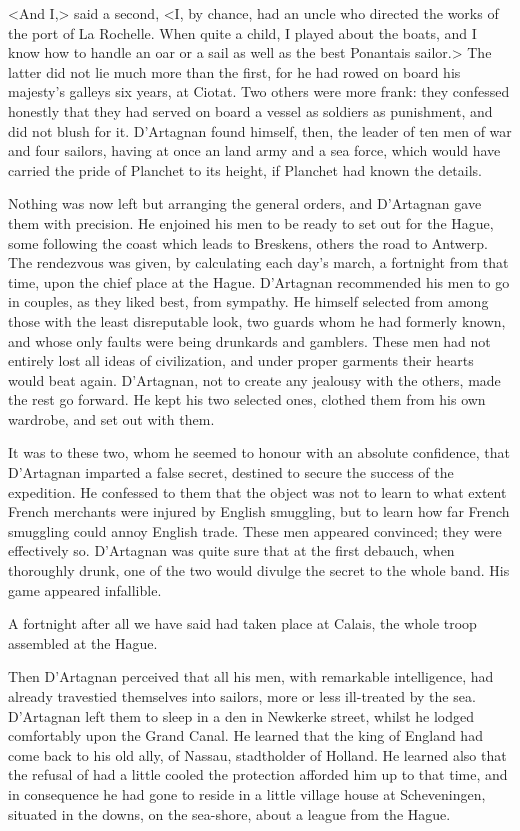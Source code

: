 <And I,> said a second, <I, by chance, had an uncle who directed the works of the port of La Rochelle. When quite a child, I played about the boats, and I know how to handle an oar or a sail as well as the best Ponantais sailor.> The latter did not lie much more than the first, for he had rowed on board his majesty's galleys six years, at Ciotat. Two others were more frank: they confessed honestly that they had served on board a vessel as soldiers as punishment, and did not blush for it. D'Artagnan found himself, then, the leader of ten men of war and four sailors, having at once an land army and a sea force, which would have carried the pride of Planchet to its height, if Planchet had known the details.

Nothing was now left but arranging the general orders, and D'Artagnan gave them with precision. He enjoined his men to be ready to set out for the Hague, some following the coast which leads to Breskens, others the road to Antwerp. The rendezvous was given, by calculating each day's march, a fortnight from that time, upon the chief place at the Hague. D'Artagnan recommended his men to go in couples, as they liked best, from sympathy. He himself selected from among those with the least disreputable look, two guards whom he had formerly known, and whose only faults were being drunkards and gamblers. These men had not entirely lost all ideas of civilization, and under proper garments their hearts would beat again. D'Artagnan, not to create any jealousy with the others, made the rest go forward. He kept his two selected ones, clothed them from his own wardrobe, and set out with them.

It was to these two, whom he seemed to honour with an absolute confidence, that D'Artagnan imparted a false secret, destined to secure the success of the expedition. He confessed to them that the object was not to learn to what extent French merchants were injured by English smuggling, but to learn how far French smuggling could annoy English trade. These men appeared convinced; they were effectively so. D'Artagnan was quite sure that at the first debauch, when thoroughly drunk, one of the two would divulge the secret to the whole band. His game appeared infallible.

A fortnight after all we have said had taken place at Calais, the whole troop assembled at the Hague.

Then D'Artagnan perceived that all his men, with remarkable intelligence, had already travestied themselves into sailors, more or less ill-treated by the sea. D'Artagnan left them to sleep in a den in Newkerke street, whilst he lodged comfortably upon the Grand Canal. He learned that the king of England had come back to his old ally,  of Nassau, stadtholder of Holland. He learned also that the refusal of  had a little cooled the protection afforded him up to that time, and in consequence he had gone to reside in a little village house at Scheveningen, situated in the downs, on the sea-shore, about a league from the Hague.

